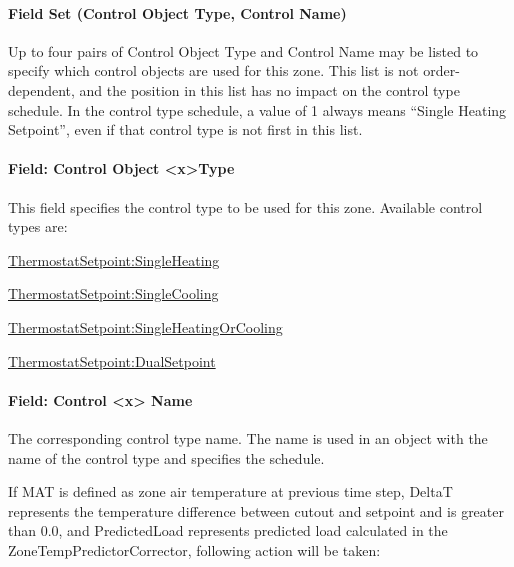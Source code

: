 \paragraph{Field Set (Control Object Type, Control Name)}\label{field-set-control-object-type-control-name}

Up to four pairs of Control Object Type and Control Name may be listed to specify which control objects are used for this zone. This list is not order-dependent, and the position in this list has no impact on the control type schedule. In the control type schedule, a value of 1 always means ``Single Heating Setpoint'', even if that control type is not first in this list.

\paragraph{Field: Control Object \textless{}x\textgreater{}Type}\label{field-control-object-xtype}

This field specifies the control type to be used for this zone. Available control types are:

\hyperref[thermostatsetpointsingleheating]{ThermostatSetpoint:SingleHeating}

\hyperref[thermostatsetpointsinglecooling]{ThermostatSetpoint:SingleCooling}

\hyperref[thermostatsetpointsingleheatingorcooling]{ThermostatSetpoint:SingleHeatingOrCooling}

\hyperref[thermostatsetpointdualsetpoint]{ThermostatSetpoint:DualSetpoint}

\paragraph{Field: Control \textless{}x\textgreater{} Name}\label{field-control-x-name}

The corresponding control type name. The name is used in an object with the name of the control type and specifies the schedule.

If MAT is defined as zone air temperature at previous time step, DeltaT represents the temperature difference between cutout and setpoint and is greater than 0.0, and PredictedLoad represents predicted load calculated in the ZoneTempPredictorCorrector, following action will be taken:

